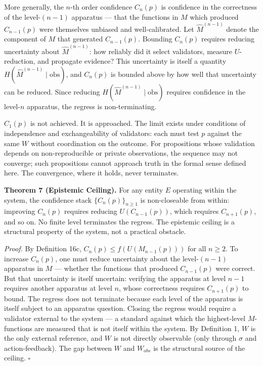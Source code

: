 \documentclass[
]{article}
\begin{document}
More generally, the \(n\)-th order confidence \(C_n(p)\) is confidence
in the correctness of the level-\((n-1)\) apparatus --- that the
functions in \(M\) which produced \(C_{n-1}(p)\) were themselves
unbiased and well-calibrated. Let \(\hat{M}^{(n-1)}\) denote the
component of \(M\) that generated \(C_{n-1}(p)\). Bounding \(C_n(p)\)
requires reducing uncertainty about \(\hat{M}^{(n-1)}\): how reliably
did it select validators, measure \(U\)-reduction, and propagate
evidence? This uncertainty is itself a quantity
\(H(\hat{M}^{(n-1)} \mid \text{obs})\), and \(C_n(p)\) is bounded above
by how well that uncertainty can be reduced. Since reducing
\(H(\hat{M}^{(n-1)} \mid \text{obs})\) requires confidence in the
level-\(n\) apparatus, the regress is non-terminating.

\(C_1(p)\) is not achieved. It is approached. The limit exists under
conditions of independence and exchangeability of validators: each must
test \(p\) against the same \(W\) without coordination on the outcome.
For propositions whose validation depends on non-reproducible or private
observations, the sequence may not converge; such propositions cannot
approach truth in the formal sense defined here. The convergence, where
it holds, never terminates.

\textbf{Theorem 7 (Epistemic Ceiling).} For any entity \(E\) operating
within the system, the confidence stack \(\{C_n(p)\}_{n \geq 1}\) is
non-closeable from within: improving \(C_n(p)\) requires reducing
\(U(C_{n-1}(p))\), which requires \(C_{n+1}(p)\), and so on. No finite
level terminates the regress. The epistemic ceiling is a structural
property of the system, not a practical obstacle.

\emph{Proof.} By Definition 16c, \(C_n(p) \leq f(U(M_{n-1}(p)))\) for
all \(n \geq 2\). To increase \(C_n(p)\), one must reduce uncertainty
about the level-\((n-1)\) apparatus in \(M\) --- whether the functions
that produced \(C_{n-1}(p)\) were correct. But that uncertainty is
itself uncertain: verifying the apparatus at level \(n-1\) requires
another apparatus at level \(n\), whose correctness requires
\(C_{n+1}(p)\) to bound. The regress does not terminate because each
level of the apparatus is itself subject to an apparatus question.
Closing the regress would require a validator external to the system ---
a standard against which the highest-level \(M\)-functions are measured
that is not itself within the system. By Definition 1, \(W\) is the only
external reference, and \(W\) is not directly observable (only through
\(\sigma\) and action-feedback). The gap between \(W\) and \(W_{obs}\)
is the structural source of the ceiling. \(\square\)
\end{document}
